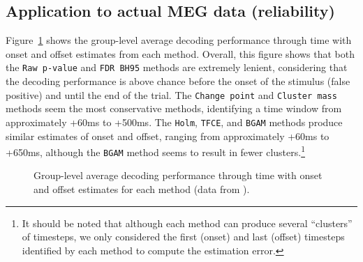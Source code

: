 \documentclass[
  man,
  floatsintext,
  longtable,
  a4paper,
  nolmodern,
  notxfonts,
  notimes,
  colorlinks=true,linkcolor=blue,citecolor=blue,urlcolor=blue]{apa7}
\begin{document}
\newpage

\subsection{Application to actual MEG data
(reliability)}\label{application-to-actual-meg-data-reliability}

Figure~\ref{fig-onset-offset} shows the group-level average decoding
performance through time with onset and offset estimates from each
method. Overall, this figure shows that both the \texttt{Raw\ p-value}
and \texttt{FDR\ BH95} methods are extremely lenient, considering that
the decoding performance is above chance before the onset of the
stimulus (false positive) and until the end of the trial. The
\texttt{Change\ point} and \texttt{Cluster\ mass} methods seem the most
conservative methods, identifying a time window from approximately +60ms
to +500ms. The \texttt{Holm}, \texttt{TFCE}, and \texttt{BGAM} methods
produce similar estimates of onset and offset, ranging from
approximately +60ms to +650ms, although the \texttt{BGAM} method seems
to result in fewer clusters.\footnote{It should be noted that although
  each method can produce several ``clusters'' of timesteps, we only
  considered the first (onset) and last (offset) timesteps identified by
  each method to compute the estimation error.}

\begin{figure}[!htb]

\caption{\label{fig-onset-offset}Group-level average decoding
performance through time with onset and offset estimates for each method
(data from ).}


\end{figure}%
\end{document}
